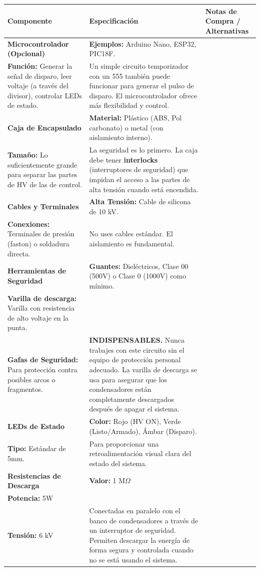 \documentclass[11pt, a4paper]{article}
\begin{document}
\begin{longtable}{|p{3.5cm}|p{4.5cm}|p{6cm}|}
\hline
\rowcolor[gray]{0.9}
\textbf{Componente} & \textbf{Especificación} & \textbf{Notas de Compra / Alternativas} \\
\hline
\endhead

\textbf{Microcontrolador (Opcional)} & 
\textbf{Ejemplos:} Arduino Nano, ESP32, PIC18F. \\
\textbf{Función:} Generar la señal de disparo, leer voltaje (a través del divisor), controlar LEDs de estado. & 
Un simple circuito temporizador con un 555 también puede funcionar para generar el pulso de disparo. El microcontrolador ofrece más flexibilidad y control. \\
\hline

\textbf{Caja de Encapsulado} & 
\textbf{Material:} Plástico (ABS, Pol carbonato) o metal (con aislamiento interno). \\
\textbf{Tamaño:} Lo suficientemente grande para separar las partes de HV de las de control. & 
La seguridad es lo primero. La caja debe tener \textbf{interlocks} (interruptores de seguridad) que impidan el acceso a las partes de alta tensión cuando está encendida. \\
\hline

\textbf{Cables y Terminales} & 
\textbf{Alta Tensión:} Cable de silicona de 10 kV. \\
\textbf{Conexiones:} Terminales de presión (faston) o soldadura directa. & 
No uses cables estándar. El aislamiento es fundamental. \\
\hline

\textbf{Herramientas de Seguridad} & 
\textbf{Guantes:} Dieléctricos, Clase 00 (500V) o Clase 0 (1000V) como mínimo. \\
\textbf{Varilla de descarga:} Varilla con resistencia de alto voltaje en la punta. \\
\textbf{Gafas de Seguridad:} Para protección contra posibles arcos o fragmentos. & 
\textbf{INDISPENSABLES.} Nunca trabajes con este circuito sin el equipo de protección personal adecuado. La varilla de descarga se usa para asegurar que los condensadores están completamente descargados después de apagar el sistema. \\
\hline

\textbf{LEDs de Estado} & 
\textbf{Color:} Rojo (HV ON), Verde (Listo/Armado), Ámbar (Disparo). \\
\textbf{Tipo:} Estándar de 5mm. & 
Para proporcionar una retroalimentación visual clara del estado del sistema. \\
\hline

\textbf{Resistencias de Descarga} & 
\textbf{Valor:} 1 M$\Omega$ \\
\textbf{Potencia:} 5W \\
\textbf{Tensión:} 6 kV & 
Conectadas en paralelo con el banco de condensadores a través de un interruptor de seguridad. Permiten descargar la energía de forma segura y controlada cuando no se está usando el sistema. \\
\hline

\end{longtable}
\end{document}
